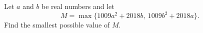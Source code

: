 Let $a$ and $b$ be real numbers and let
\[
M=\max\{1009a^2+2018b,\ 1009b^2+2018a\}.
\]
Find the smallest possible value of $M$.

